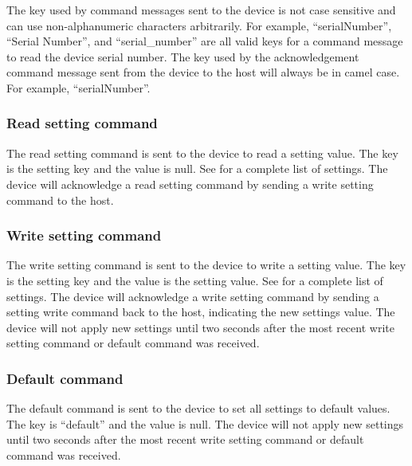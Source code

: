 The key used by command messages sent to the device is not case sensitive and can use non-alphanumeric characters arbitrarily.  For example, \enquote{serialNumber}, \enquote{Serial Number}, and \enquote{serial\_number} are all valid keys for a command message to read the device serial number.  The key used by the acknowledgement command message sent from the device to the host will always be in camel case. For example, \enquote{serialNumber}.

\subsubsection{Read setting command}

The read setting command is sent to the device to read a setting value.  The key is the setting key and the value is null.  See  for a complete list of settings.  The device will acknowledge a read setting command by sending a write setting command to the host.


\subsubsection{Write setting command}

The write setting command is sent to the device to write a setting value.  The key is the setting key and the value is the setting value.  See  for a complete list of settings.  The device will acknowledge a write setting command by sending a setting write command back to the host, indicating the new settings value.  The device will not apply new settings until two seconds after the most recent write setting command or default command was received.


\subsubsection{Default command}

The default command is sent to the device to set all settings to default values.  The key is \enquote{default} and the value is null.  The device will not apply new settings until two seconds after the most recent write setting command or default command was received.


